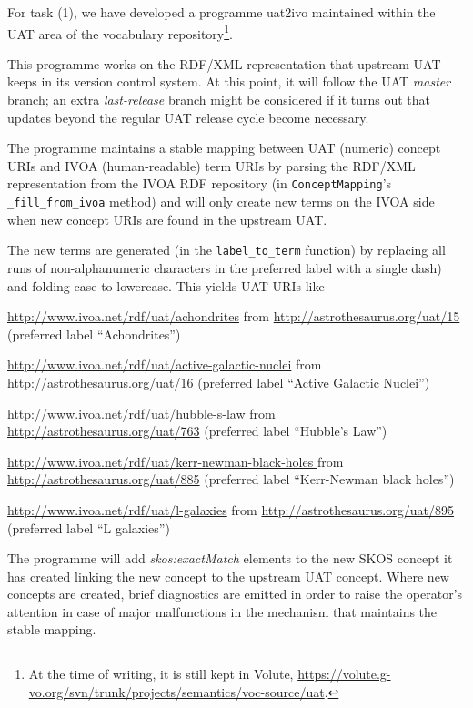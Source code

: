 \documentclass[11pt,a4paper]{ivoa}
\newcommand{\vocterm}[1]{\emph{\color{termcolor}#1}}
\begin{document}
For task (1), we have developed a programme uat2ivo maintained within
the UAT area of the vocabulary repository\footnote{At the time of
writing, it is still kept in Volute,
\url{https://volute.g-vo.org/svn/trunk/projects/semantics/voc-source/uat}.}.

This programme works on the RDF/XML representation that upstream UAT
keeps in its version control system.  At this point, it will follow the
UAT \emph{master} branch; an extra \emph{last-release} branch might be
considered if it turns out that updates beyond the regular UAT release
cycle become necessary.

The programme maintains a stable mapping between UAT (numeric) concept
URIs and IVOA (human-readable) term URIs by parsing the RDF/XML
representation from the IVOA RDF repository (in \verb|ConceptMapping|'s
\verb|_fill_from_ivoa| method) and will only create new terms on the
IVOA side when new concept URIs are found in the upstream UAT.

The new terms are generated (in the \verb|label_to_term| function) by
replacing all runs of non-alphanumeric characters in the preferred label
with a single dash) and folding case to lowercase.  This yields UAT URIs
like

\begin{bigdescription}
\item[\url{http://www.ivoa.net/rdf/uat/achondrites}] from
\url{http://astrothesaurus.org/uat/15} (preferred label ``Achondrites'')
\item[\url{http://www.ivoa.net/rdf/uat/active-galactic-nuclei}]
from \url{http://astrothesaurus.org/uat/16} (preferred label ``Active
Galactic Nuclei'')
\item[\url{http://www.ivoa.net/rdf/uat/hubble-s-law}]
from \url{http://astrothesaurus.org/uat/763} (preferred label ``Hubble's
Law'')
\item[\url{http://www.ivoa.net/rdf/uat/kerr-newman-black-holes }]
from \url{http://astrothesaurus.org/uat/885} (preferred label
``Kerr-Newman black holes'')
\item[\url{http://www.ivoa.net/rdf/uat/l-galaxies}] from
\url{http://astrothesaurus.org/uat/895} (preferred label ``L galaxies'')
\end{bigdescription}

The programme will add \vocterm{skos:exactMatch} elements to the new
SKOS concept it has created linking the new concept to the upstream UAT
concept.  Where new concepts are created, brief diagnostics are emitted
in order to raise the operator's attention in case of major malfunctions
in the mechanism that maintains the stable mapping.
\end{document}
